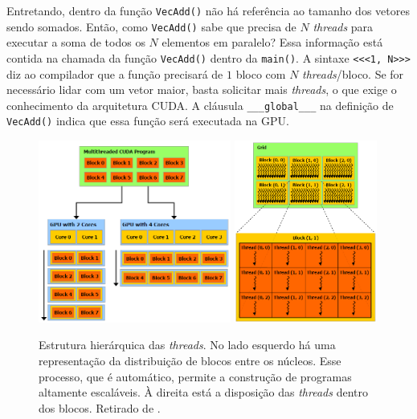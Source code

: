 	Entretando, dentro da função \texttt{VecAdd()} não há referência ao tamanho dos vetores sendo somados. Então, como \texttt{VecAdd()} sabe que precisa de $N$ \textit{threads} para executar a soma de todos os $N$ elementos em paralelo? Essa informação está contida na chamada da função \texttt{VecAdd()} dentro da \texttt{main()}. A sintaxe \texttt{<<<1, N>>>} diz ao compilador que a função precisará de $1$ bloco com $N$ \textit{threads}/bloco. Se for necessário lidar com um vetor maior, basta solicitar mais \textit{threads}, o que exige o conhecimento da arquitetura CUDA. A cláusula \texttt{\_\_\_global\_\_\_} na definição de \texttt{VecAdd()} indica que essa função será executada na GPU.

	\begin{figure}[hpt]
		\begin{center}
			\includegraphics[height=6cm]{figs/cuda/Blocos_nas_CPUs.png}
			\includegraphics[height=6cm]{figs/cuda/Blocos_No_Grid_E_Suas_threads.png}
		\end{center}
		\caption{\label{figHierarquiaThreads}Estrutura hierárquica das \textit{threads}. No lado esquerdo há uma representação da distribuição de blocos entre os núcleos. Esse processo, que é automático, permite a construção de programas altamente escaláveis. À direita está a disposição das \textit{threads} dentro dos blocos. Retirado de \cite{CUDACpg}.}
	\end{figure}

